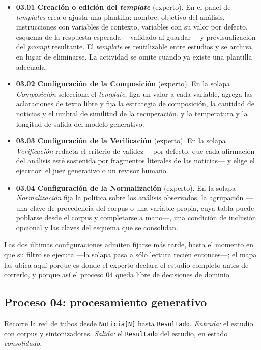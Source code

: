 \documentclass[12pt]{report}
\begin{document}
\begin{itemize}
  \item \textbf{03.01 Creación o edición del \textit{template}} (experto). En el panel de \textit{templates} crea o ajusta una plantilla: nombre, objetivo del análisis, instrucciones con variables de contexto, variables con su valor por defecto, esquema de la respuesta esperada ---validado al guardar--- y previsualización del \textit{prompt} resultante. El \textit{template} es reutilizable entre estudios y se archiva en lugar de eliminarse. La actividad se omite cuando ya existe una plantilla adecuada.
  \item \textbf{03.02 Configuración de la Composición} (experto). En la solapa \textit{Composición} selecciona el \textit{template}, liga un valor a cada variable, agrega las aclaraciones de texto libre y fija la estrategia de composición, la cantidad de noticias y el umbral de similitud de la recuperación, y la temperatura y la longitud de salida del modelo generativo.
  \item \textbf{03.03 Configuración de la Verificación} (experto). En la solapa \textit{Verificación} redacta el criterio de validez ---por defecto, que cada afirmación del análisis esté sostenida por fragmentos literales de las noticias--- y elige el ejecutor: el juez generativo o un revisor humano.
  \item \textbf{03.04 Configuración de la Normalización} (experto). En la solapa \textit{Normalización} fija la política sobre los análisis observados, la agrupación ---una clave de procedencia del corpus o una variable propia, cuya tabla puede poblarse desde el corpus y completarse a mano---, una condición de inclusión opcional y las claves del esquema que se consolidan.
\end{itemize}

Las dos últimas configuraciones admiten fijarse más tarde, hasta el momento en que su filtro se ejecuta ---la solapa pasa a sólo lectura recién entonces---; el mapa las ubica aquí porque es donde el experto declara el estudio completo antes de correrlo, y porque así el proceso 04 queda libre de decisiones de dominio.

\subsection{Proceso 04: procesamiento generativo}
\label{sec:proc-iag}

Recorre la red de tubos desde \texttt{Noticia[N]} hasta \texttt{Resultado}. \textit{Entrada:} el estudio con corpus y sintonizadores. \textit{Salida:} el \texttt{Resultado} del estudio, en estado \textit{consolidado}.
\end{document}
